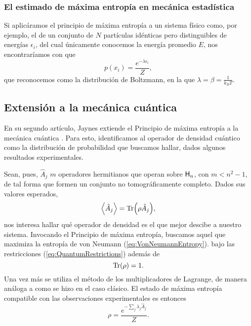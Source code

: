 \subsubsection{El estimado de máxima entropía en mecánica estadística}

Si aplicáramos el principio de máxima entropía a un sistema físico  como, por ejemplo, el de un conjunto de $N$ partículas idénticas pero distinguibles de energías $\epsilon_{i}$, del cual únicamente conocemos la energía promedio $E$, nos encontraríamos con que
\begin{equation}\label{eq:Boltzman}
    p(x_{i})=\frac{e^{-\lambda\epsilon_{i}}}{Z},
\end{equation}
que reconocemos como la distribución de Boltzmann, en la que $\lambda=\beta=\frac{1}{k_{B}T}$. 
\subsection{Extensión a la mecánica cuántica}

En su segundo artículo, Jaynes extiende el Principio de máxima entropía a la mecánica cuántica \cite{JaynesII}. Para esto, identificamos al operador de densidad cuántico como la distribución de probabilidad que buscamos hallar, dados algunos resultados experimentales.

Sean, pues, $\hat{A}_{j}$ $m$ operadores hermitianos que operan sobre ${\sf H}_{n}$, con $m<n^{2}-1$, de tal forma que formen un conjunto no tomográficamente completo. Dados sus valores esperados,
\begin{equation}\label{eq:QuantumRestrictions}
    \expval{\hat{A}_{j}}=\Tr(\rho \hat{A}_{j}),
\end{equation} 
nos interesa hallar qué operador de densidad es el que mejor descibe a nuestro sistema. Invocando el Principio de máxima entropía, buscamos aquel que maximiza la entropía de von Neumann (\ref{eq:VonNeumannEntropy}). bajo las restricciones (\ref{eq:QuantumRestrictions}) además de
\begin{equation}\label{eq:TraceRestriction}
    \Tr(\rho)=1.
\end{equation}
Una vez más se utiliza el método de los multiplicadores de Lagrange, de manera análoga a como se hizo en el caso clásico. El estado de máxima entropía compatible con las observaciones experimentales es entonces
\begin{equation*}
    \rho=\frac{e^{-\sum_{j} \lambda_{j} \hat{A}_{j}}}{Z}.
\end{equation*}
